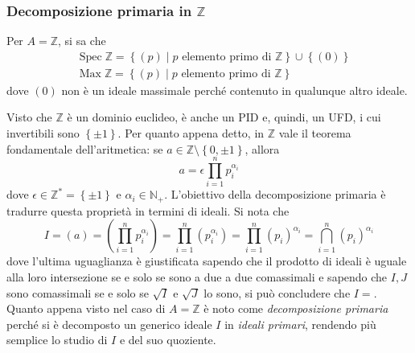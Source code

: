 \documentclass[12pt]{scrartcl}
\theoremstyle{style}
\theoremstyle{style1}
\numberwithin{equation}{subsection}
\begin{document}
\subsubsection{Decomposizione primaria in $\mathbb{Z}$}
Per $A = \mathbb{Z}$, si sa che
\[
	\begin{split}
		&\operatorname{Spec} \mathbb{Z} = \left\{ (p)  \mid p \text{ elemento primo di }  \mathbb{Z}\right\} \cup \left\{(0) \right\} \\
		& \operatorname{Max} \mathbb{Z} = \left\{ (p)  \mid p \text{ elemento primo di }  \mathbb{Z}\right\}
	\end{split}
\] 
dove $(0)$ non \`e un ideale massimale perch\'e contenuto in qualunque altro ideale.

Visto che $\mathbb{Z}$ \`e un dominio euclideo, \`e anche un PID e, quindi, un UFD, i cui invertibili sono $\left\{ \pm 1\right\} $.
Per quanto appena detto, in $\mathbb{Z}$ vale il teorema fondamentale dell'aritmetica: se $a \in \mathbb{Z}\setminus\left\{ 0,\pm 1 \right\} $, allora
\[
a = \epsilon  \prod_{i=1} ^n p_i^{\alpha _i} 
\] 
dove $\epsilon \in \mathbb{Z}^*=\left\{ \pm 1 \right\} $ e $\alpha _i \in \mathbb{N}_+$.
L'obiettivo della decomposizione primaria \`e tradurre questa propriet\`a in termini di ideali.
Si nota che
\begin{equation}
I = (a) = \left(\prod_{i=1}^{n} p_i^{\alpha _i}  \right) =\prod_{i=1}^{n} \left(p_i^{\alpha _i} \right)  =\prod_{i=1}^{n} (p_i)^{\alpha _i}=  \bigcap_{i=1} ^n (p_i)^{\alpha _i} 
\end{equation}
dove l'ultima uguaglianza \`e giustificata sapendo che il prodotto di ideali \`e uguale alla loro intersezione se e solo se sono a due a due comassimali e sapendo che $I,J$ sono comassimali se e solo se $\sqrt{I} $ e $\sqrt{J} $ lo sono, si pu\`o concludere che $I = $.
Quanto appena visto nel caso di $A = \mathbb{Z}$ \`e noto come \textit{decomposizione primaria} perch\'e si \`e decomposto un generico ideale $I$ in \textit{ideali primari}, rendendo pi\`u semplice lo studio di $I$ e del suo quoziente.
\end{document}
